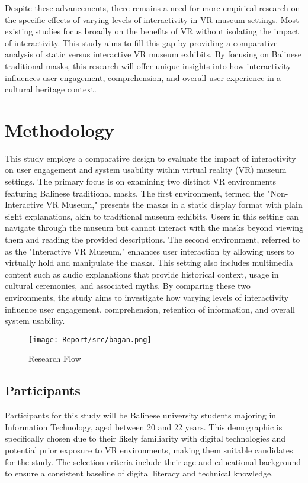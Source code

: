 \documentclass[conference]{IEEEtran}
\begin{document}
Despite these advancements, there remains a need for more empirical research on the specific effects of varying levels of interactivity in VR museum settings. Most existing studies focus broadly on the benefits of VR without isolating the impact of interactivity. This study aims to fill this gap by providing a comparative analysis of static versus interactive VR museum exhibits. By focusing on Balinese traditional masks, this research will offer unique insights into how interactivity influences user engagement, comprehension, and overall user experience in a cultural heritage context.

\section{Methodology}

This study employs a comparative design to evaluate the impact of interactivity on user engagement and system usability within virtual reality (VR) museum settings. The primary focus is on examining two distinct VR environments featuring Balinese traditional masks. The first environment, termed the "Non-Interactive VR Museum," presents the masks in a static display format with plain sight explanations, akin to traditional museum exhibits. Users in this setting can navigate through the museum but cannot interact with the masks beyond viewing them and reading the provided descriptions. The second environment, referred to as the "Interactive VR Museum," enhances user interaction by allowing users to virtually hold and manipulate the masks. This setting also includes multimedia content such as audio explanations that provide historical context, usage in cultural ceremonies, and associated myths. By comparing these two environments, the study aims to investigate how varying levels of interactivity influence user engagement, comprehension, retention of information, and overall system usability.

\begin{figure}[htbp]
    \centering
    \texttt{[image: Report/src/bagan.png]}
    \caption{Research Flow}
    \label{fig:researchflowchart}
\end{figure}



\subsection{Participants}
Participants for this study will be Balinese university students majoring in Information Technology, aged between 20 and 22 years. This demographic is specifically chosen due to their likely familiarity with digital technologies and potential prior exposure to VR environments, making them suitable candidates for the study. The selection criteria include their age and educational background to ensure a consistent baseline of digital literacy and technical knowledge.
\end{document}
